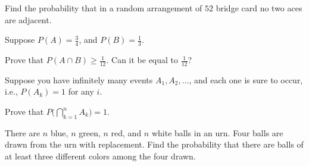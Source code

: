 \begin{problem}[Handout 2, \# 16]
  Find the probability that in a random arrangement of \(52\) bridge card
  no two aces are adjacent.
\end{problem}
\begin{solution*}
\end{solution*}

\begin{problem}[Handout 2, \# 17]
  Suppose \(P(A)=\frac{3}{4}\), and \(P(B)=\frac{1}{3}\).

  \noindent Prove that \(P(A\cap B)\geq\frac{1}{12}\). Can it be equal to
  \(\frac{1}{12}\)?
\end{problem}
\begin{solution*}
\end{solution*}

\begin{problem}[Handout 2, \# 18]
  Suppose you have infinitely many events \(A_1,A_2,\dotsc\), and each one
  is sure to occur, i.e., \(P(A_k)=1\) for any \(i\).

  \noindent Prove that \(P\bigl(\bigcap_{k=1}^n A_k\bigr)=1\).
\end{problem}
\begin{solution*}
\end{solution*}

\begin{problem}[Handout 2, \# 19]
  There are \(n\) blue, \(n\) green, \(n\) red, and \(n\) white balls in an
  urn. Four balls are drawn from the urn with replacement. Find the
  probability that there are balls of at least three different colors among
  the four drawn.
\end{problem}
\begin{solution*}
\end{solution*}

